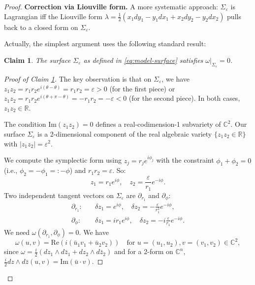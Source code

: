 \documentclass[12pt]{article}
\newtheorem{claim}[theorem]{Claim}
\newcommand{\bR}{\mathbb{R}}
\newcommand{\bC}{\mathbb{C}}
\newcommand{\eps}{\varepsilon}
\newcommand{\om}{\omega}
\newcommand{\la}{\lambda}
\begin{document}
\begin{proof}
\textbf{Correction via Liouville form.} A more systematic approach: $\Sigma_\eps$ is Lagrangian iff the Liouville form $\la = \frac{1}{2}(x_1 dy_1 - y_1 dx_1 + x_2 dy_2 - y_2 dx_2)$ pulls back to a closed form on $\Sigma_\eps$.

Actually, the simplest argument uses the following standard result:

\begin{claim}
\label{claim:lagrangian-exact}
The surface $\Sigma_\eps$ as defined in \eqref{eq:model-surface} satisfies $\om|_{\Sigma_\eps} = 0$.
\end{claim}

\begin{proof}[Proof of Claim \ref{claim:lagrangian-exact}]
The key observation is that on $\Sigma_\eps$, we have $z_1 z_2 = r_1 r_2 e^{i(\theta - \theta)} = r_1 r_2 = \eps > 0$ (for the first piece) or $z_1 z_2 = r_1 r_2 e^{i(\theta + \pi - \theta)} = -r_1 r_2 = -\eps < 0$ (for the second piece). In both cases, $z_1 z_2 \in \bR$.

The condition $\mathrm{Im}(z_1 z_2) = 0$ defines a real-codimension-1 subvariety of $\bC^2$. Our surface $\Sigma_\eps$ is a 2-dimensional component of the real algebraic variety $\{z_1 z_2 \in \bR\}$ with $|z_1 z_2| = \eps^2$.

We compute the symplectic form using $z_j = r_j e^{i\phi_j}$ with the constraint $\phi_1 + \phi_2 = 0$ (i.e., $\phi_2 = -\phi_1 =: -\phi$) and $r_1 r_2 = \eps$. So:
\[
  z_1 = r_1 e^{i\phi},\quad z_2 = \frac{\eps}{r_1} e^{-i\phi}.
\]
Two independent tangent vectors on $\Sigma_\eps$ are $\partial_{r_1}$ and $\partial_\phi$:
\begin{align*}
  \partial_{r_1} \colon\quad & \delta z_1 = e^{i\phi},\quad \delta z_2 = -\frac{\eps}{r_1^2}e^{-i\phi}, \\
  \partial_\phi \colon\quad & \delta z_1 = ir_1 e^{i\phi},\quad \delta z_2 = -i\frac{\eps}{r_1}e^{-i\phi}.
\end{align*}
We need $\om(\partial_{r_1}, \partial_\phi) = 0$. We have
\[
  \om(u,v) = \mathrm{Re}(i(\bar u_1 v_1 + \bar u_2 v_2)) \quad \text{for } u = (u_1,u_2), v = (v_1, v_2) \in \bC^2,
\]
since $\om = \frac{i}{2}(dz_1\wedge d\bar z_1 + dz_2 \wedge d\bar z_2)$ and for a 2-form on $\bC^n$, $\frac{i}{2}dz\wedge d\bar z(u,v) = \mathrm{Im}(\bar u \cdot v)$.


\end{proof}
\end{proof}
\end{document}
